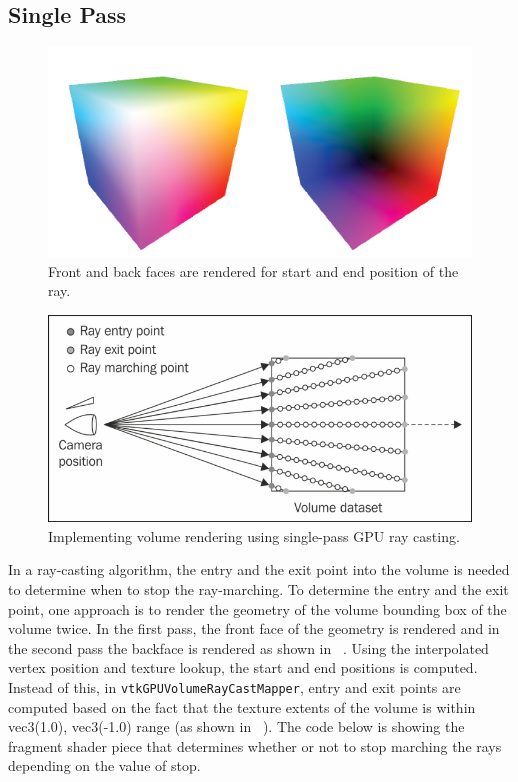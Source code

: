 \subsection{Single Pass}
\begin{figure}[ht]
  \centering
  \includegraphics[width=\columnwidth]{frontandback.png}
  \caption{Front and back faces are rendered for start and end position of the
  ray.}
  \label{fig:frontandback}
\end{figure}%


\begin{figure}[ht]
  \centering
  \includegraphics[width=\columnwidth]{raycasting.jpg}
  \caption{Implementing volume rendering using single-pass GPU ray casting.}
  \label{fig:raycasting}
\end{figure}%

In a ray-casting algorithm, the entry and the exit point into the volume is
needed to determine when to stop the ray-marching. To determine the entry and
the exit point, one approach is to render the geometry of the volume bounding
box of the volume twice. In the first pass, the front face of the geometry is
rendered and in the second pass the backface is rendered as shown in
~. Using the interpolated vertex position and
texture lookup, the start and end positions is computed. Instead of this, in
\texttt{vtkGPUVolumeRayCastMapper}, entry and exit points are computed based on
the fact that the texture extents of the volume is within vec3(1.0), vec3(-1.0)
range (as shown in ~). The code below is showing the
fragment shader piece that determines whether or not to stop marching the rays
depending on the value of stop.

